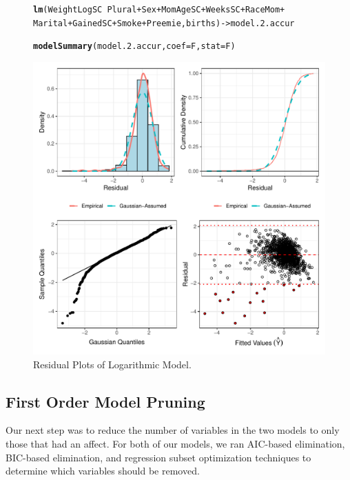 \documentclass{article}\usepackage[]{graphicx}\usepackage[]{xcolor}
\makeatletter
\def\maxwidth{ %
  \ifdim\Gin@nat@width>\linewidth
    \linewidth
  \else
    \Gin@nat@width
  \fi
}
\newcommand{\hlopt}[1]{\textcolor[rgb]{0,0,0}{#1}}%
\newcommand{\hlstd}[1]{\textcolor[rgb]{0.345,0.345,0.345}{#1}}%
\newcommand{\hlkwb}[1]{\textcolor[rgb]{0.69,0.353,0.396}{#1}}%
\newcommand{\hlkwc}[1]{\textcolor[rgb]{0.333,0.667,0.333}{#1}}%
\newcommand{\hlkwd}[1]{\textcolor[rgb]{0.737,0.353,0.396}{\textbf{#1}}}%
\newenvironment{kframe}{%
 \def\at@end@of@kframe{}%
 \ifinner\ifhmode%
  \def\at@end@of@kframe{\end{minipage}}%
  \begin{minipage}{\columnwidth}%
 \fi\fi%
 \def\FrameCommand##1{\hskip\@totalleftmargin \hskip-\fboxsep
 \colorbox{shadecolor}{##1}\hskip-\fboxsep
     \hskip-\linewidth \hskip-\@totalleftmargin \hskip\columnwidth}%
 \MakeFramed {\advance\hsize-\width
   \@totalleftmargin\z@ \linewidth\hsize
   \@setminipage}}%
 {\par\unskip\endMakeFramed%
 \at@end@of@kframe}
\newenvironment{knitrout}{}{} %
\makeatother
\begin{document}
\begin{figure}
\begin{knitrout}
\color{fgcolor}\begin{kframe}
\begin{alltt}
\hlkwd{lm}\hlstd{(WeightLogSC} \hlopt{~} \hlstd{Plural} \hlopt{+} \hlstd{Sex} \hlopt{+} \hlstd{MomAgeSC} \hlopt{+} \hlstd{WeeksSC} \hlopt{+} \hlstd{RaceMom} \hlopt{+}
     \hlstd{Marital} \hlopt{+} \hlstd{GainedSC} \hlopt{+} \hlstd{Smoke} \hlopt{+} \hlstd{Preemie, births)} \hlkwb{->} \hlstd{model.2.accur}

\hlkwd{modelSummary}\hlstd{(model.2.accur,} \hlkwc{coef}\hlstd{=F,} \hlkwc{stat}\hlstd{=F)}
\end{alltt}
\end{kframe}
\includegraphics[width=\maxwidth]{figure/unnamed-chunk-14-1} 
\end{knitrout}
\caption{Residual Plots of Logarithmic Model.} 
\label{resid.plots.log}
\end{figure}

\subsection{First Order Model Pruning}\label{fom.prune}

Our next step was to reduce the number of variables in the two models to only those that had an affect. For both of our models, we ran AIC-based elimination, BIC-based elimination, and regression subset optimization techniques to determine which variables should be removed.
\end{document}
